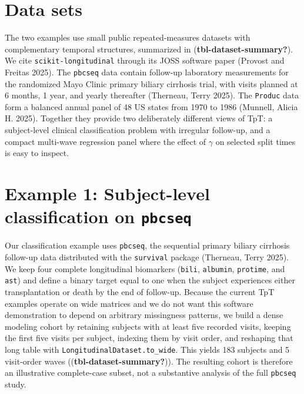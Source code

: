 \documentclass[
]{article}
\begin{document}
\section{Data sets}\label{data-sets}

The two examples use small public repeated-measures datasets with
complementary temporal structures, summarized in
(\textbf{tbl-dataset-summary?}). We cite \texttt{scikit-longitudinal}
through its JOSS software paper (Provost and Freitas 2025). The
\texttt{pbcseq} data contain follow-up laboratory measurements for the
randomized Mayo Clinic primary biliary cirrhosis trial, with visits
planned at 6 months, 1 year, and yearly thereafter (Therneau, Terry
2025). The \texttt{Produc} data form a balanced annual panel of 48 US
states from 1970 to 1986 (Munnell, Alicia H. 2025). Together they
provide two deliberately different views of TpT: a subject-level
clinical classification problem with irregular follow-up, and a compact
multi-wave regression panel where the effect of \(\gamma\) on selected
split times is easy to inspect.

\label{tbl-dataset-summary}

\section{\texorpdfstring{Example 1: Subject-level classification on
\texttt{pbcseq}}{Example 1: Subject-level classification on pbcseq}}\label{example-1-subject-level-classification-on-pbcseq}

Our classification example uses \texttt{pbcseq}, the sequential primary
biliary cirrhosis follow-up data distributed with the \texttt{survival}
package (Therneau, Terry 2025). We keep four complete longitudinal
biomarkers (\texttt{bili}, \texttt{albumin}, \texttt{protime}, and
\texttt{ast}) and define a binary target equal to one when the subject
experiences either transplantation or death by the end of follow-up.
Because the current TpT examples operate on wide matrices and we do not
want this software demonstration to depend on arbitrary missingness
patterns, we build a dense modeling cohort by retaining subjects with at
least five recorded visits, keeping the first five visits per subject,
indexing them by visit order, and reshaping that long table with
\texttt{LongitudinalDataset.to\_wide}. This yields 183 subjects and 5
visit-order waves ((\textbf{tbl-dataset-summary?})). The resulting
cohort is therefore an illustrative complete-case subset, not a
substantive analysis of the full \texttt{pbcseq} study.
\end{document}
